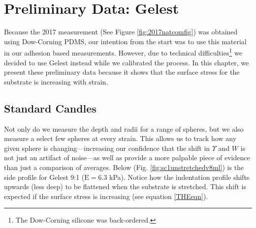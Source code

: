 \section{Preliminary Data: Gelest}
Because the 2017 measurement \cite{xu2017direct} (See Figure \ref{fig:2017natcomfig}) was obtained using Dow-Corning PDMS, our intention from the start was to use this material in our adhesion based measurements. However, due to technical difficulties\footnote{The Dow-Corning silicone was back-ordered.} we decided to use Gelest instead while we calibrated the process. In this chapter, we present these preliminary data because it shows that the surface stress for the substrate is increasing with strain.  

\subsection{Standard Candles}
Not only do we measure the depth and radii for a range of spheres, but we also measure a select few spheres at every strain. This allows us to track how any given sphere is changing---increasing our confidence that the shift in $\Upsilon$ and $ W $ is not just an artifact of noise---as well as provide a more palpable piece of evidence than just a comparison of averages. Below (Fig. \ref{fig:sc1unstretchedv8ml}) is the side profile for Gelest 9:1 ($\text{E}=6.3$ kPa). Notice how the indentation profile shifts upwards (less deep) to be flattened when the substrate is stretched. This shift is expected if the surface stress is increasing (see equation \ref{THEeqn}).

